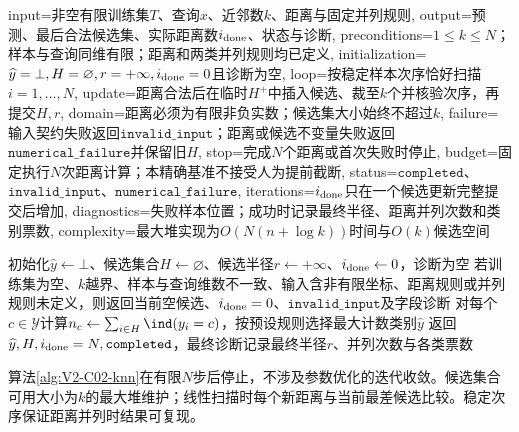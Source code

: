 \begin{AlgorithmContract}{
  input={非空有限训练集$T$、查询$x$、近邻数$k$、距离与固定并列规则},
  output={预测、最后合法候选集、实际距离数$i_{\rm done}$、状态与诊断},
  preconditions={$1\le k\le N$；样本与查询同维有限；距离和两类并列规则均已定义},
  initialization={$\widehat y=\bot,H=\varnothing,r=+\infty,i_{\rm done}=0$且诊断为空},
  loop={按稳定样本次序恰好扫描$i=1,\ldots,N$},
  update={距离合法后在临时$H^+$中插入候选、裁至$k$个并核验次序，再提交$H,r$},
  domain={距离必须为有限非负实数；候选集大小始终不超过$k$},
  failure={输入契约失败返回$\mathtt{invalid\_input}$；距离或候选不变量失败返回$\mathtt{numerical\_failure}$并保留旧$H$},
  stop={完成$N$个距离或首次失败时停止},
  budget={固定执行$N$次距离计算；本精确基准不接受人为提前截断},
  status={$\mathtt{completed}$、$\mathtt{invalid\_input}$、$\mathtt{numerical\_failure}$},
  iterations={$i_{\rm done}$只在一个候选更新完整提交后增加},
  diagnostics={失败样本位置；成功时记录最终半径、距离并列次数和类别票数},
  complexity={最大堆实现为$O(N(n+\log k))$时间与$O(k)$候选空间}
}
\begin{algorithm}[H]
\caption{线性扫描的\kNN{}分类}\label{alg:V2-C02-knn}
初始化$\widehat y\leftarrow\bot$、候选集合$H\leftarrow\varnothing$、候选半径$r\leftarrow+\infty$、$i_{\rm done}\leftarrow0$，诊断为空\;
若训练集为空、$k$越界、样本与查询维数不一致、输入含非有限坐标、距离规则或并列规则未定义，则返回当前空候选、$i_{\rm done}=0$、$\mathtt{invalid\_input}$及字段诊断\;
对每个$c\in\mathcal Y$计算$n_c\leftarrow\sum_{i\in H}\ind(y_i=c)$，按预设规则选择最大计数类别$\widehat y$\;
返回$\widehat y,H,i_{\rm done}=N,\mathtt{completed}$，最终诊断记录最终半径$r$、并列次数与各类票数\;
\end{algorithm}
\end{AlgorithmContract}

算法\ref{alg:V2-C02-knn}在有限$N$步后停止，不涉及参数优化的迭代收敛。候选集合可用大小为$k$的最大堆维护；线性扫描时每个新距离与当前最差候选比较。稳定次序保证距离并列时结果可复现。


